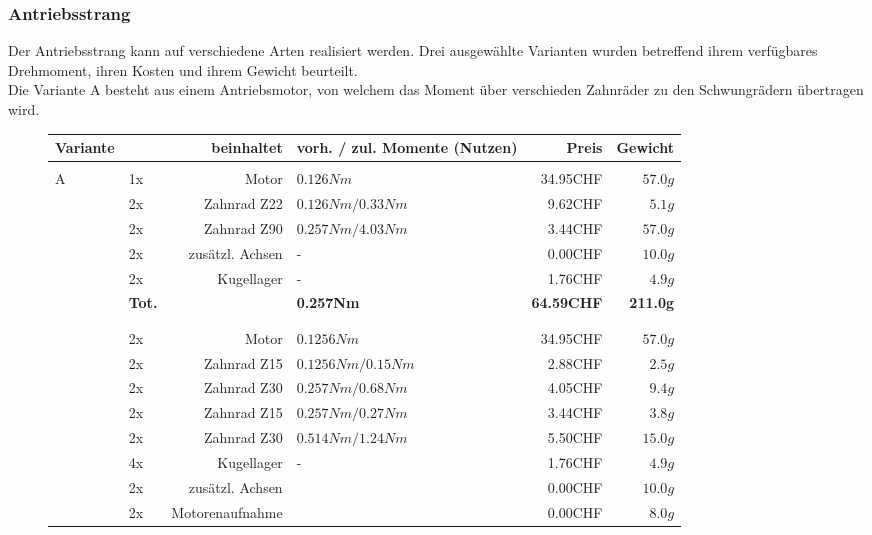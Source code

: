 ﻿\subsubsection{Antriebsstrang}

Der Antriebsstrang kann auf verschiedene Arten realisiert werden. Drei ausgewählte Varianten wurden betreffend ihrem verfügbares Drehmoment, ihren Kosten und ihrem Gewicht beurteilt.\\
Die Variante A besteht aus einem Antriebsmotor, von welchem das Moment über verschieden Zahnräder zu den Schwungrädern übertragen wird.    





\begin{figure}[h!]
    \begin{tabular}{p{0.5cm}p{0.8cm}rp{3cm}rr}
    \textbf{Variante} & \multicolumn{2}{r}{\textbf{beinhaltet}} & \textbf{vorh. / zul. Momente (Nutzen)} & \textbf{Preis} & \textbf{Gewicht} \\\hline
          &       &                 &                      &          &  \\
    \multirow{9}[2]{*}{A}
          & 1x    & Motor           & $0.126 Nm$           & 34.95CHF & $57.0 g$ \\
          & 2x    & Zahnrad Z22     & $0.126 Nm / 0.33 Nm$ &  9.62CHF & $5.1 g$  \\
          & 2x    & Zahnrad Z90     & $0.257 Nm / 4.03 Nm$ &  3.44CHF & $57.0 g$ \\
          & 2x    & zusätzl. Achsen & -                    &  0.00CHF & $10.0 g$ \\
          & 2x    & Kugellager      & -                    &  1.76CHF & $4.9 g$  \\
       
      
          & \textbf{Tot.} &  & \textbf{0.257Nm} & \textbf{64.59CHF} & \textbf{211.0g} \\
    \multirow{10}[2]{*}{B}
  	  &       &                 &                      &          &  \\
          &       &                 &                      &          &  \\
          & 2x    & Motor           & $0.1256 Nm$          & 34.95CHF & $57.0 g$ \\
          & 2x    & Zahnrad Z15     & $0.1256 Nm / 0.15 Nm$& 2.88CHF  & $2.5 g$  \\
          & 2x    & Zahnrad Z30     & $0.257 Nm / 0.68 Nm$ & 4.05CHF  & $9.4 g$  \\
          & 2x    & Zahnrad Z15     & $0.257 Nm / 0.27 Nm$ & 3.44CHF  & $3.8 g$  \\
          & 2x    & Zahnrad Z30     & $0.514 Nm / 1.24 Nm$ & 5.50CHF  & $15.0 g$ \\
          & 4x    & Kugellager      & -                    & 1.76CHF  & $4.9 g$  \\
          & 2x    & zusätzl. Achsen &                      & 0.00CHF  & $10.0 g$ \\
          & 2x    & Motorenaufnahme &                      & 0.00CHF  & $8.0 g$  \\
        

\end{tabular}
\end{figure}
